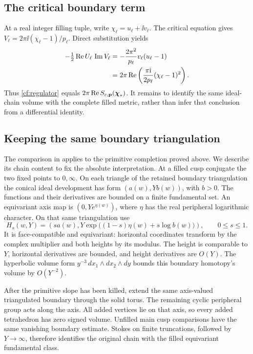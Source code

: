 \subsection{The critical boundary term}
At a real integer filling tuple, write $\chi_\ell=u_\ell+\ii v_\ell$.
The critical equation gives
$V_\ell=2\pi\ii(\chi_\ell-1)/p_\ell$.
Direct substitution yields
\begin{equation}\label{cf:boundary-cancellation}
\begin{split}
 -\tfrac12\operatorname{Re} U_\ell\,\operatorname{Im} V_\ell
  &=-\frac{2\pi^2}{p_\ell}v_\ell(u_\ell-1)\\
  &=2\pi\operatorname{Re}\left(\frac{\pi\mathrm i}{2p_\ell}
                              (\chi_\ell-1)^2\right).
\end{split}
\end{equation}
Thus \eqref{cf:regulator} equals
$2\pi\operatorname{Re} S_{\varepsilon,\mathbf p}(\boldsymbol\chi_*)$.
It remains to identify the same ideal-chain volume with
the complete filled metric, rather than infer that conclusion
from a differential identity.

\subsection{Keeping the same boundary triangulation}
The comparison in \cite[Section~7.3]{Marked} applies to the
primitive completion proved above. We describe its chain
content to fix the absolute interpretation.
At a filled cusp conjugate the two fixed points to $0,\infty$.
On each triangle of the retained boundary triangulation
the conical ideal development has form
$(a(w),Yb(w))$, with $b>0$.
The functions and their derivatives are bounded on a finite
fundamental set. An equivariant axis map is
$(0,Y e^{\eta(w)})$, where $\eta$ has the real peripheral
logarithmic character. On that same triangulation use
\begin{equation}\label{cf:homotopy}
 H_s(w,Y)=\left(sa(w),
     Y\exp\bigl((1-s)\eta(w)+s\log b(w)\bigr)\right),
       \qquad 0\le s\le1.
\end{equation}
It is face-compatible and equivariant: horizontal coordinates
transform by the complex multiplier and both heights by its
modulus. The height is comparable to $Y$, horizontal
derivatives are bounded, and height derivatives are $O(Y)$.
The hyperbolic volume form
$y^{-3}\,dx_1\wedge dx_2\wedge dy$ bounds this boundary
homotopy's volume by $O(Y^{-2})$.

After the primitive slope has been killed, extend the same
axis-valued triangulated boundary through the solid torus.
The remaining cyclic peripheral group acts along the axis.
All added vertices lie on that axis, so every added
tetrahedron has zero signed volume.
Unfilled main cusp comparisons have the same vanishing
boundary estimate.
Stokes on finite truncations, followed by $Y\to\infty$,
therefore identifies the original chain with the filled
equivariant fundamental class.

